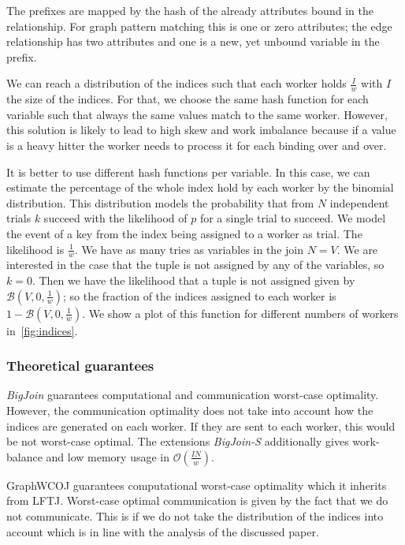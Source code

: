 The prefixes are mapped by the hash of the already attributes bound in the relationship.
For graph pattern matching this is one or zero attributes;
the edge relationship has two attributes and one is a new, yet unbound variable in the prefix.

We can reach a distribution of the indices such that each worker holds $\frac{I}{w}$ with $I$ the size of the indices.
For that, we choose the same hash function for each variable such that always the same values match to the same worker.
However, this solution is likely to lead to high skew and work imbalance because if a value is a heavy hitter the
worker needs to process it for each binding over and over.

It is better to use different hash functions per variable.
In this case, we can estimate the percentage of the whole index hold by each worker by the binomial distribution.
This distribution models the probability that from $N$ independent trials $k$ succeed with the likelihood of $p$ for a single trial
to succeed.
We model the event of a key from the index being assigned to a worker as trial.
The likelihood is $\frac{1}{w}$.
We have as many tries as variables in the join $N = V$.
We are interested in the case that the tuple is not assigned by any of the variables, so $k = 0$.
Then we have the likelihood that a tuple is not assigned given by $\mathcal{B} (V, 0, \frac{1}{w})$;
so the fraction of the indices assigned to each worker is $1 - \mathcal{B} (V, 0, \frac{1}{w})$.
We show a plot of this function for different numbers of workers in~\cref{fig:indices}.

\subsubsection{Theoretical guarantees}
\textit{BigJoin} guarantees computational and communication worst-case optimality.
However, the communication optimality does not take into account how the indices are generated on each worker.
If they are sent to each worker, this would be not worst-case optimal.
The extensions \textit{BigJoin-S} additionally gives work-balance and low memory usage in $\mathcal{O} (\frac{IN}{w})$.

GraphWCOJ guarantees computational worst-case optimality which it inherits from \textsc{LFTJ}.
Worst-case optimal communication is given by the fact that we do not communicate.
This is if we do not take the distribution of the indices into account which is in line with the analysis of the discussed paper.

